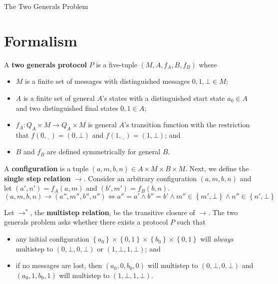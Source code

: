 \documentclass[12pt]{article}
\newcommand{\set}[1]{\left\{#1\right\}}
\newcommand{\und}{\underline{\phantom{\ \ }}}
\begin{document}
\begin{center}
  \Huge The Two Generals Problem
\end{center}

\section{Formalism}
A \textbf{two generals protocol} $P$ is a five-tuple $(M, A, f_A, B, f_B)$
where
\begin{itemize}
  \item
    $M$ is a finite set of messages with distinguished messages $0, 1, \bot \in
    M$;
  \item
    $A$ is a finite set of general $A$'s states with a distinguished start
    state $a_0 \in A$ and two distinguished final states $0, 1 \in A$;
  \item
    $f_A: Q_A \times M \to Q_A \times M$ is general $A$'s transition function
    with the restriction that $f(0, \und) = (0, \bot)$ and $f(1, \und) = (1,
    \bot)$; and
  \item
    $B$ and $f_B$ are defined symmetrically for general $B$.
\end{itemize}

A \textbf{configuration} is a tuple $(a, m, b, n) \in A \times M \times B
\times M$. Next, we define the \textbf{single step relation} $\to$.
Consider an arbitrary configuration $(a, m, b, n)$ and let $(a', n') = f_A(a,
m)$ and $(b', m') = f_B(b, n)$.
\[
  (a, m, b, n) \to (a'', m'', b'', n'')
    \iff
  a'' = a' \land b'' = b' \land m'' \in \set{m', \bot} \land n'' \in \set{n', \bot}
\]

\newcommand{\startzero}{(a_0, 0, b_0, 0)}
\newcommand{\startone}{(a_0, 1, b_0, 1)}
\newcommand{\agreezero}{(0, \bot, 0, \bot)}
\newcommand{\agreeone}{(1, \bot, 1, \bot)}
Let $\to^*$, the \textbf{multistep relation}, be the transitive closure of
$\to$. The two generals problem asks whether there exists a protocol $P$ such
that
\begin{itemize}
  \item
    any initial configuration $\set{a_0} \times \set{0, 1} \times \set{b_0}
    \times \set{0, 1}$ will \emph{always} multistep to $\agreezero$ or
    $\agreeone$; and
  \item
    if no messages are lost, then $\startzero$ will multistep to $\agreezero$
    and $\startone$ will multistep to $\agreeone$.
\end{itemize}
\end{document}
